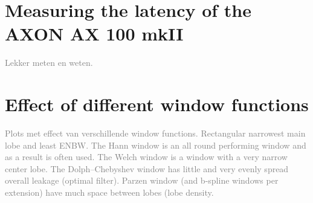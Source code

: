 \documentclass[10pt,twocolumn]{article}
\begin{document}
\appendix
\section{Measuring the latency of the AXON AX 100 mkII}  \label{sec:ax100}
\textcolor{gray}{Lekker meten en weten.}

\section{Effect of different window functions}  \label{sec:windows}
\textcolor{gray}{Plots met effect van verschillende window functions. Rectangular narrowest main lobe and least ENBW. The Hann window is an all round performing window and as a result is often used. The Welch window is a window with a very narrow center lobe. The Dolph–Chebyshev window has little and very evenly spread overall leakage (optimal filter). Parzen window (and b-spline windows per extension) have much space between lobes (lobe density. }
\end{document}
